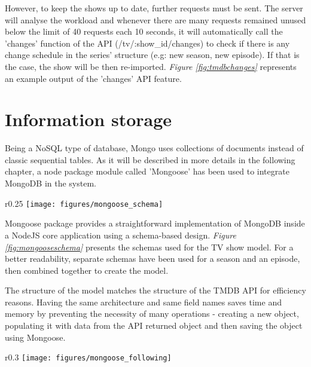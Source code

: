 However, to keep the shows up to date, further requests must be sent. The server will analyse the workload and whenever there are many requests remained unused below the limit of 40 requests each 10 seconds, it will automatically call the 'changes' function of the API (/tv/:show\_id/changes) to check if there is any change schedule in the series' structure (e.g: new season, new episode). If that is the case, the show will be then re-imported. \textit{Figure \ref{fig:tmdbchanges}} represents an example output of the 'changes' API feature.

\section{Information storage}

Being a NoSQL type of database, Mongo uses collections of documents instead of classic sequential tables. As it will be described in more details in the following chapter, a node package module called 'Mongoose' has been used to integrate MongoDB in the system.

\begin{wrapfigure}{r}{0.25\textwidth}
\centering
\texttt{[image: figures/mongoose\_schema]}
\caption{TV Show schema}
\vspace{-2.5em}
\label{fig:mongooseschema}
\end{wrapfigure}

Mongoose \cite{17} package provides a straightforward implementation of MongoDB inside a NodeJS core application using a schema-based design. \textit{Figure \ref{fig:mongooseschema}} presents the schemas used for the TV show model. For a better readability, separate schemas have been used for a season and an episode, then combined together to create the model.

The structure of the model matches the structure of the TMDB API for efficiency reasons. Having the same architecture and same field names saves time and memory by preventing the necessity of many operations - creating a new object, populating it with data from the API returned object and then saving the object using Mongoose.

\begin{wrapfigure}{r}{0.3\textwidth}
\centering
\vspace{-2em}
\texttt{[image: figures/mongoose\_following]}
\caption{"Following" schema}
\vspace{-2em}
\label{fig:mongoosefollowing}
\end{wrapfigure}

